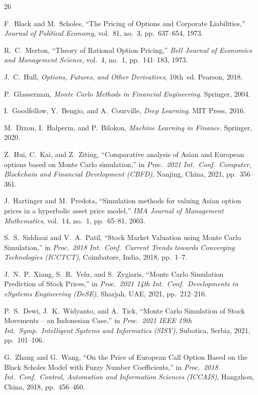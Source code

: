 \documentclass[conference]{IEEEtran}
\begin{document}
\begin{thebibliography}{26}

 F.~Black and M.~Scholes, ``The Pricing of Options and Corporate Liabilities,'' \textit{Journal of Political Economy}, vol.~81, no.~3, pp.~637--654, 1973.

 R.~C.~Merton, ``Theory of Rational Option Pricing,'' \textit{Bell Journal of Economics and Management Science}, vol.~4, no.~1, pp.~141--183, 1973.

 J.~C.~Hull, \textit{Options, Futures, and Other Derivatives}, 10th~ed. Pearson, 2018.

 P.~Glasserman, \textit{Monte Carlo Methods in Financial Engineering}. Springer, 2004.

 I.~Goodfellow, Y.~Bengio, and A.~Courville, \textit{Deep Learning}. MIT Press, 2016.

 M.~Dixon, I.~Halperin, and P.~Bilokon, \textit{Machine Learning in Finance}. Springer, 2020.

 Z.~Hui, C.~Kai, and Z.~Ziting, ``Comparative analysis of Asian and European options based on Monte Carlo simulation,'' in \textit{Proc.\ 2021 Int.\ Conf.\ Computer, Blockchain and Financial Development (CBFD)}, Nanjing, China, 2021, pp.~356--361.

 J.~Hartinger and M.~Predota, ``Simulation methods for valuing Asian option prices in a hyperbolic asset price model,'' \textit{IMA Journal of Management Mathematics}, vol.~14, no.~1, pp.~65--81, 2003.

 S.~S.~Siddiaui and V.~A.~Patil, ``Stock Market Valuation using Monte Carlo Simulation,'' in \textit{Proc.\ 2018 Int.\ Conf.\ Current Trends towards Converging Technologies (ICCTCT)}, Coimbatore, India, 2018, pp.~1--7.

 J.~N.~P.~Xiang, S.~R.~Velu, and S.~Zygiaris, ``Monte Carlo Simulation Prediction of Stock Prices,'' in \textit{Proc.\ 2021 14th Int.\ Conf.\ Developments in eSystems Engineering (DeSE)}, Sharjah, UAE, 2021, pp.~212--216.

 P.~S.~Dewi, J.~K.~Widyanto, and A.~Tick, ``Monte Carlo Simulation of Stock Movements -- an Indonesian Case,'' in \textit{Proc.\ 2021 IEEE 19th Int.\ Symp.\ Intelligent Systems and Informatics (SISY)}, Subotica, Serbia, 2021, pp.~101--106.

 G.~Zhang and G.~Wang, ``On the Price of European Call Option Based on the Black Scholes Model with Fuzzy Number Coefficients,'' in \textit{Proc.\ 2018 Int.\ Conf.\ Control, Automation and Information Sciences (ICCAIS)}, Hangzhou, China, 2018, pp.~456--460.


\end{thebibliography}
\end{document}
